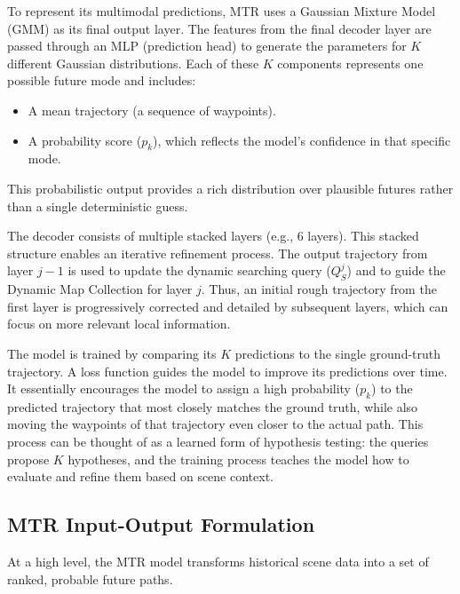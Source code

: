 To represent its multimodal predictions, MTR uses a Gaussian Mixture Model (GMM) as its final output layer. The features from the final decoder layer are passed through an MLP (prediction head) to generate the parameters for $K$ different Gaussian distributions. Each of these $K$ components represents one possible future mode and includes:
\begin{itemize}
    \item A mean trajectory (a sequence of waypoints).
    \item A probability score ($p_k$), which reflects the model's confidence in that specific mode.
\end{itemize}
This probabilistic output provides a rich distribution over plausible futures rather than a single deterministic guess.

The decoder consists of multiple stacked layers (e.g., 6 layers). This stacked structure enables an iterative refinement process. The output trajectory from layer $j-1$ is used to update the dynamic searching query ($Q_S^j$) and to guide the Dynamic Map Collection for layer $j$. Thus, an initial rough trajectory from the first layer is progressively corrected and detailed by subsequent layers, which can focus on more relevant local information.

The model is trained by comparing its $K$ predictions to the single ground-truth trajectory. A loss function guides the model to improve its predictions over time. It essentially encourages the model to assign a high probability ($p_k$) to the predicted trajectory that most closely matches the ground truth, while also moving the waypoints of that trajectory even closer to the actual path. This process can be thought of as a learned form of hypothesis testing: the queries propose $K$ hypotheses, and the training process teaches the model how to evaluate and refine them based on scene context.

\subsection{MTR Input-Output Formulation}
\label{sec:model_mtr_io}

At a high level, the MTR model transforms historical scene data into a set of ranked, probable future paths.

